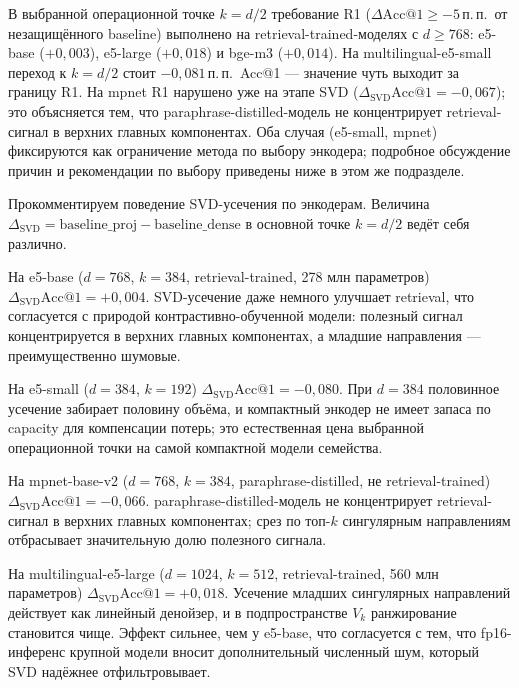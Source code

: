 \documentclass[a4paper, 12pt, oneside, openany]{article}
\begin{document}
В выбранной операционной точке $k = d/2$ требование R1 ($\Delta\mathrm{Acc@1} \geq -5$\,п.\,п.\ от незащищённого baseline) выполнено на retrieval-trained-моделях с $d \geq 768$: e5-base ($+0{,}003$), e5-large ($+0{,}018$) и bge-m3 ($+0{,}014$). На multilingual-e5-small переход к $k = d/2$ стоит $-0{,}081$\,п.\,п.\ Acc@1 --- значение чуть выходит за границу R1. На mpnet R1 нарушено уже на этапе SVD ($\Delta_{\mathrm{SVD}}\mathrm{Acc@1} = -0{,}067$); это объясняется тем, что paraphrase-distilled-модель не концентрирует retrieval-сигнал в верхних главных компонентах. Оба случая (e5-small, mpnet) фиксируются как ограничение метода по выбору энкодера; подробное обсуждение причин и рекомендации по выбору приведены ниже в этом же подразделе.



Прокомментируем поведение SVD-усечения по энкодерам. Величина $\Delta_{\mathrm{SVD}} = \mathrm{baseline\_proj} - \mathrm{baseline\_dense}$ в основной точке $k = d/2$ ведёт себя различно.

На e5-base ($d = 768$, $k = 384$, retrieval-trained, 278 млн параметров) $\Delta_{\mathrm{SVD}}\mathrm{Acc@1} = +0{,}004$. SVD-усечение даже немного улучшает retrieval, что согласуется с природой контрастивно-обученной модели: полезный сигнал концентрируется в верхних главных компонентах, а младшие направления — преимущественно шумовые.

На e5-small ($d = 384$, $k = 192$) $\Delta_{\mathrm{SVD}}\mathrm{Acc@1} = -0{,}080$. При $d = 384$ половинное усечение забирает половину объёма, и компактный энкодер не имеет запаса по capacity для компенсации потерь; это естественная цена выбранной операционной точки на самой компактной модели семейства.

На mpnet-base-v2 ($d = 768$, $k = 384$, paraphrase-distilled, не retrieval-trained) $\Delta_{\mathrm{SVD}}\mathrm{Acc@1} = -0{,}066$. paraphrase-distilled-модель не концентрирует retrieval-сигнал в верхних главных компонентах; срез по топ-$k$ сингулярным направлениям отбрасывает значительную долю полезного сигнала.

На multilingual-e5-large ($d = 1024$, $k = 512$, retrieval-trained, 560 млн параметров) $\Delta_{\mathrm{SVD}}\mathrm{Acc@1} = +0{,}018$. Усечение младших сингулярных направлений действует как линейный денойзер, и в подпространстве $V_k$ ранжирование становится чище. Эффект сильнее, чем у e5-base, что согласуется с тем, что fp16-инференс крупной модели вносит дополнительный численный шум, который SVD надёжнее отфильтровывает.
\end{document}
